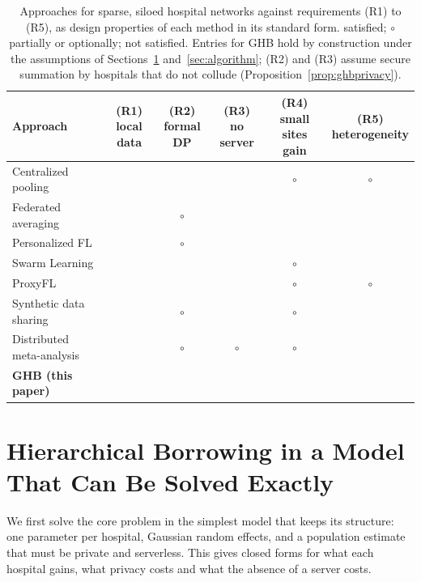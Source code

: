 \documentclass[acmsmall,screen,review]{acmart}
\newcommand{\yes}{\textcolor{famC}{\ding{51}}}
\newcommand{\no}{\textcolor{famO}{\ding{55}}}
\newcommand{\partly}{\textcolor{famT}{$\boldsymbol{\circ}$}}
\theoremstyle{acmdefinition}
\begin{document}
\begin{table}[t]
\caption{Approaches for sparse, siloed hospital networks against requirements (R1) to (R5), as design properties of each method in its standard form. \yes{} satisfied; \partly{} partially or optionally; \no{} not satisfied. Entries for GHB hold by construction under the assumptions of Sections~\ref{sec:model} and~\ref{sec:algorithm}; (R2) and (R3) assume secure summation by hospitals that do not collude (Proposition~\ref{prop:ghbprivacy}).}
\label{tab:approaches}
\small
\begin{tabularx}{\linewidth}{@{}>{\raggedright\arraybackslash}Xccccc@{}}
\toprule
Approach & \shortstack{(R1)\\local data} & \shortstack{(R2)\\formal DP} & \shortstack{(R3)\\no server} & \shortstack{(R4)\\small sites gain} & \shortstack{(R5)\\heterogeneity}\\
\midrule
Centralized pooling & \no & \no & \no & \partly & \partly\\
Federated averaging \cite{mcmahan2017communication} & \yes & \partly & \no & \no & \no\\
Personalized FL \cite{collins2021exploiting,li2021ditto} & \yes & \partly & \no & \yes & \yes\\
Swarm Learning \cite{warnatherresthal2021swarm} & \yes & \no & \yes & \partly & \no\\
ProxyFL \cite{kalra2023decentralized} & \yes & \yes & \yes & \partly & \partly\\
Synthetic data sharing \cite{jordon2019pate} & \yes & \partly & \yes & \partly & \no\\
Distributed meta-analysis \cite{dersimonian1986meta,duan2020learning} & \yes & \partly & \partly & \partly & \yes\\
\textbf{GHB (this paper)} & \yes & \yes & \yes & \yes & \yes\\
\bottomrule
\end{tabularx}
\end{table}

\section{Hierarchical Borrowing in a Model That Can Be Solved Exactly}\label{sec:model}

We first solve the core problem in the simplest model that keeps its structure: one parameter per hospital, Gaussian random effects, and a population estimate that must be private and serverless. This gives closed forms for what each hospital gains, what privacy costs and what the absence of a server costs.
\end{document}
